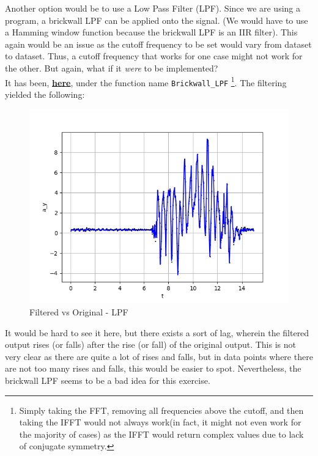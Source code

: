 \documentclass[oneside]{book}
\begin{document}
\bigskip
Another option would be to use a Low Pass Filter (LPF). Since we are using a program, a brickwall LPF can be applied onto the signal. (We would have to use a Hamming window function because the brickwall LPF is an IIR filter). This again would be an issue as the cutoff frequency to be set would vary from dataset to dataset. Thus, a cutoff frequency that works for one case might not work for the other. But again, what if it \textit{were} to be implemented?\\
It has been, \href{https://github.com/HarryNyquist/Odometry/blob/main/Odometry_Bad_Tries/Bad_Filter_attempts.py}{\underline{\textbf{here}}}, under the function name \verb|Brickwall_LPF| \footnote{Simply taking the FFT, removing all frequencies above the cutoff, and then taking the IFFT would not always work(in fact, it might not even work for the majority of cases) as the IFFT would return complex values due to lack of conjugate symmetry.}. The filtering yielded the following:
\begin{figure}[htbp]
    \centering
    \includegraphics[width=1.3\textwidth]{figs/Filtered_using_brickwall_LPF.png}
    \caption{Filtered vs Original - LPF}
\end{figure}
It would be hard to see it here, but there exists a sort of lag, wherein the filtered output rises (or falls) after the rise (or fall) of the original output. This is not very clear as there are quite a lot of rises and falls, but in data points where there are not too many rises and falls, this would be easier to spot. Nevertheless, the brickwall LPF seems to be a bad idea for this exercise.\\
\end{document}
